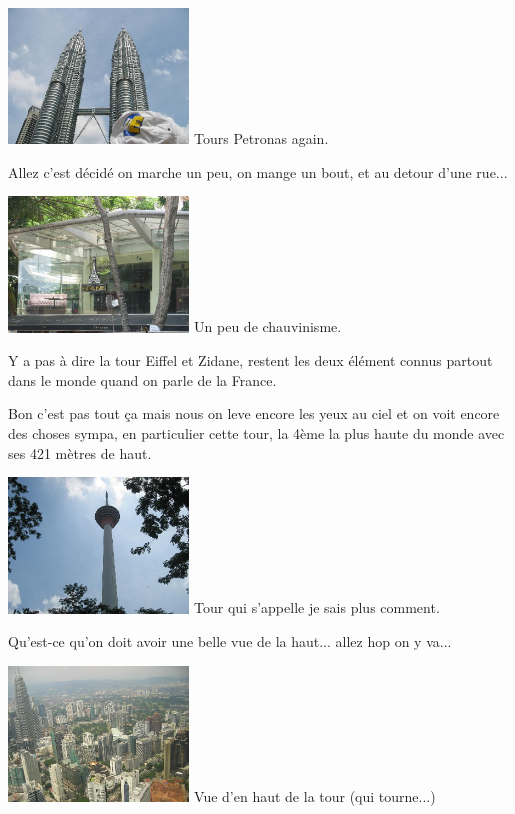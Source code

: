 \begin{multicols}{2}
\hspace*{-0.65cm}
\includegraphics[width=4.8cm]{articles/Kuala-lumpur/1210432316GlgU.jpg}
Tours Petronas again.

Allez c'est décidé on marche un peu, on mange un bout, et au detour d'une rue...

\hspace*{-0.65cm}
\includegraphics[width=4.8cm]{articles/Kuala-lumpur/1211015560vRGE.jpg}
Un peu de chauvinisme.

Y a pas à dire la tour Eiffel et Zidane, restent les deux élément connus partout dans le monde quand on parle de la France.

Bon c'est pas tout ça mais nous on leve encore les yeux au ciel et on voit encore des choses sympa, en particulier cette tour, la 4ème la plus haute du monde avec ses 421 mètres de haut.

\hspace*{-0.65cm}
\includegraphics[width=4.8cm]{articles/Kuala-lumpur/1211014906Nl6S.jpg}
Tour qui s'appelle je sais plus comment.

Qu'est-ce qu'on doit avoir une belle vue de la haut... allez hop on y va...

\hspace*{-0.65cm}
\includegraphics[width=4.8cm]{articles/Kuala-lumpur/1211014913RrBL.jpg}
Vue d'en haut de la tour (qui tourne...)


\end{multicols}
